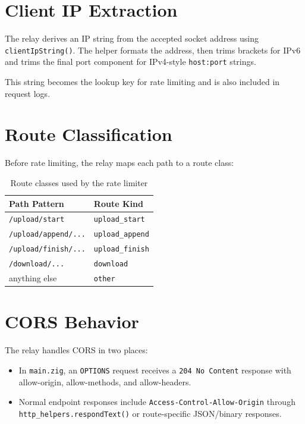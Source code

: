 \documentclass[11pt,a4paper]{report}
\begin{document}
\section{Client IP Extraction}

The relay derives an IP string from the accepted socket address using \texttt{clientIpString()}. The helper formats the address, then trims brackets for IPv6 and trims the final port component for IPv4-style \texttt{host:port} strings.

This string becomes the lookup key for rate limiting and is also included in request logs.

\section{Route Classification}

Before rate limiting, the relay maps each path to a route class:

\begin{table}[H]
\centering
\begin{tabular}{ll}
\toprule
\textbf{Path Pattern} & \textbf{Route Kind} \\
\midrule
\texttt{/upload/start} & \texttt{upload\_start} \\
\texttt{/upload/append/...} & \texttt{upload\_append} \\
\texttt{/upload/finish/...} & \texttt{upload\_finish} \\
\texttt{/download/...} & \texttt{download} \\
anything else & \texttt{other} \\
\bottomrule
\end{tabular}
\caption{Route classes used by the rate limiter}
\end{table}

\section{CORS Behavior}

The relay handles CORS in two places:

\begin{itemize}[leftmargin=1.5cm]
    \item In \texttt{main.zig}, an \texttt{OPTIONS} request receives a \texttt{204 No Content} response with allow-origin, allow-methods, and allow-headers.
    \item Normal endpoint responses include \texttt{Access-Control-Allow-Origin} through \\\texttt{http\_helpers.respondText()} or route-specific JSON/binary responses.
\end{itemize}
\end{document}
